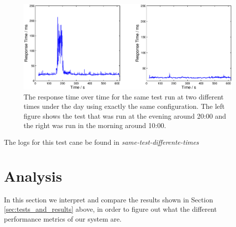 \documentclass{article}
\begin{document}
        \begin{figure}[H]
                \centerline{\includegraphics[scale=0.50]{same_test_different_time_of_day_resp_time_over_time}}
                \caption{The response time over time for the same test run at two different times under the day using exactly the same configuration. The left figure shows the test that was run at the evening around 20:00 and the right was run in the morning around 10:00.}
                \label{fig:same_test_different_time_of_day_resp_time_over_time}
        \end{figure}

    The logs for this test cane be found in \textit{same-test-differente-times}
    \section{Analysis}
        \label{sec:analysis}
        In this section we interpret and compare the results shown in Section \ref{sec:tests_and_results} above, in order to figure out what the different performance metrics of our system are.
\end{document}
